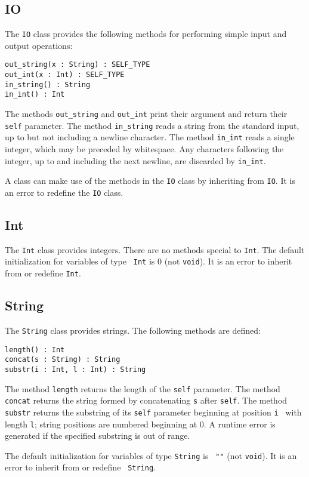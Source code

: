 \subsection{IO}
The {\tt IO} class provides the following methods for performing simple input and output
operations:
\begin{verbatim}
out_string(x : String) : SELF_TYPE
out_int(x : Int) : SELF_TYPE
in_string() : String
in_int() : Int
\end{verbatim}
The methods {\tt out\_string} and {\tt out\_int} print their argument and return
their {\tt self} parameter.  The method {\tt in\_string} reads a string from 
the standard input, up to but not including a newline character.  The method
{\tt in\_int} reads a single integer, which may be preceded by whitespace.
Any characters following the integer, up to and including the next newline,
are discarded by {\tt in\_int}.

A class can make use of the methods in the {\tt IO} class by inheriting
from {\tt IO}.  It is an error to redefine the {\tt IO} class.

\subsection{Int}
\label{sec-int}

The {\tt Int} class provides integers.  There are no methods special
to {\tt Int}.  The default initialization for variables of type {\tt
Int} is 0 (not {\tt void}). It is an error to inherit from or redefine
{\tt Int}.

\subsection{String}
The {\tt String} class provides strings.  The following methods are defined:
\begin{verbatim}
length() : Int
concat(s : String) : String
substr(i : Int, l : Int) : String
\end{verbatim}
The method {\tt length} returns the length of the {\tt self} parameter.
The method {\tt concat} returns the string formed by concatenating
{\tt s} after {\tt self}.  The method {\tt substr} returns the 
substring of its {\tt self} parameter beginning at position {\tt i }
with length {\tt l}; string positions are numbered beginning at 0.
A runtime error is generated if the specified
substring is out of range.  

The default initialization for variables of type {\tt String} is {\tt
""} (not {\tt void}).  It is an error to inherit from or redefine {\tt
String}.

